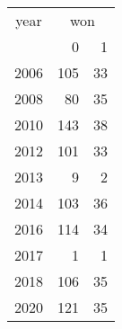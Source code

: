 \footnotesize\begin{tabular}[t]{lrr}
\toprule
\multicolumn{1}{c}{year} & \multicolumn{2}{c}{won} \\
\cmidrule(l{3pt}r{3pt}){1-1} \cmidrule(l{3pt}r{3pt}){2-3}
  & 0 & 1\\
\midrule
2006 & 105 & 33\\
2008 & 80 & 35\\
2010 & 143 & 38\\
2012 & 101 & 33\\
2013 & 9 & 2\\
2014 & 103 & 36\\
2016 & 114 & 34\\
2017 & 1 & 1\\
2018 & 106 & 35\\
2020 & 121 & 35\\
\bottomrule
\end{tabular}
